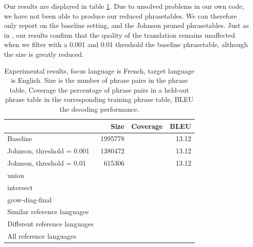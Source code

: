\documentclass[11pt]{article}
\begin{document}
Our results are displayed in table \ref{t:allResults}. Due to unsolved problems in our own code, we have not been able to produce our reduced phrasetables.
 We can therefore only report on the baseline setting, and the Johnson pruned phrasetables.
 Just as in \cite{Johnson}, our results confirm that the quality of the translation remains unaffected when we filter with a 0.001 and 0.01 threshold the baseline phrasetable, although the size is greatly reduced.








\begin{table}[t]
\center
\begin{tabular}{p{.3\linewidth} | r r r }
&Size& Coverage & BLEU \\\hline\hline
Baseline &1995778&&13.12	\\\hline
Johnson, threshold = 0.001&1380472&&13.12	\\
Johnson, threshold = 0.01&615306&&13.12	\\
\hline
union		\\
intersect	\\
grow-diag-final	\\\hline
Similar reference languages	\\
Different reference languages 	\\
All reference languages		\\\hline
\end{tabular}

\caption{Experimental results, focus language is French, target language is English. Size is the number of phrase pairs in the phrase table, Coverage the percentage of phrase pairs in a held-out phrase table in the corresponding training phrase table, BLEU the decoding performance.}
\label{t:allResults}
\end{table}
\end{document}
